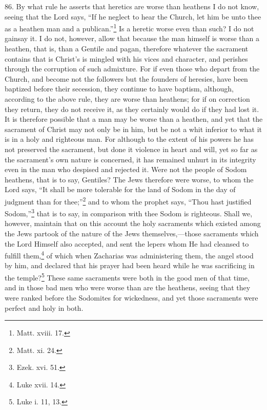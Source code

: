 86. By what rule he asserts that heretics are worse than heathens I do not know, seeing that the Lord says, ``If he neglect to hear the Church, let him be unto thee as a heathen man and a publican.''\footnote{\par  Matt. xviii. 17.} Is a heretic worse even than such? I do not gainsay it. I do not, however, allow that because the man himself is worse than a heathen, that is, than a Gentile and pagan, therefore whatever the sacrament contains that is Christ’s is mingled with his vices and character, and perishes through the corruption of such admixture. For if even those who depart from the Church, and become not the followers but the founders of heresies, have been baptized before their secession, they continue to have baptism, although, according to the above rule, they are worse than heathens; for if on correction they return, they do not receive it, as they certainly would do if they had lost it. It is therefore possible that a man may be worse than a heathen, and yet that the sacrament of Christ may not only be in him, but be not a whit inferior to what it is in a holy and righteous man. For although to the extent of his powers he has not preserved the sacrament, but done it violence in heart and will, yet so far as the sacrament’s own nature is concerned, it has remained unhurt in its integrity even in the man who despised and rejected it. Were not the people of Sodom heathens, that is to say, Gentiles? The Jews therefore were worse, to whom the Lord says, ``It shall be more tolerable for the land of Sodom in the day of judgment than for thee;''\footnote{\par  Matt. xi. 24.} and to whom the prophet says, ``Thou hast justified Sodom,''\footnote{\par  Ezek. xvi. 51.} that is to say, in comparison with thee Sodom is righteous. Shall we, however, maintain that on this account the holy sacraments which existed among the Jews partook of the nature of the Jews themselves,—those sacraments which the Lord Himself also accepted, and sent the lepers whom He had cleansed to fulfill them,\footnote{\par  Luke xvii. 14.} of which when Zacharias was administering them, the angel stood by him, and declared that his prayer had been heard while he was sacrificing in the temple?\footnote{\par  Luke i. 11, 13.} These same sacraments were both in the good men of that time, and in those bad men who were worse than are the heathens, seeing that they were ranked before the Sodomites for wickedness, and yet those sacraments were perfect and holy in both.

